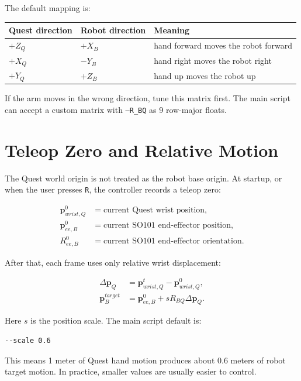 \documentclass[11pt]{article}
\begin{document}
The default mapping is:

\begin{center}
\begin{tabular}{lll}
\toprule
Quest direction & Robot direction & Meaning \\
\midrule
$+Z_Q$ & $+X_B$ & hand forward moves the robot forward \\
$+X_Q$ & $-Y_B$ & hand right moves the robot right \\
$+Y_Q$ & $+Z_B$ & hand up moves the robot up \\
\bottomrule
\end{tabular}
\end{center}

If the arm moves in the wrong direction, tune this matrix first. The main
script can accept a custom matrix with \texttt{--R\_BQ} as 9 row-major floats.

\section{Teleop Zero and Relative Motion}

The Quest world origin is not treated as the robot base origin. At startup, or
when the user presses \texttt{R}, the controller records a teleop zero:

\begin{align}
\mathbf{p}^{0}_{wrist,Q} &= \text{current Quest wrist position}, \\
\mathbf{p}^{0}_{ee,B} &= \text{current SO101 end-effector position}, \\
R^{0}_{ee,B} &= \text{current SO101 end-effector orientation}.
\end{align}

After that, each frame uses only relative wrist displacement:

\begin{align}
\Delta\mathbf{p}_{Q}
  &= \mathbf{p}^{t}_{wrist,Q} - \mathbf{p}^{0}_{wrist,Q}, \\
\mathbf{p}^{target}_{B}
  &= \mathbf{p}^{0}_{ee,B}
     + s R_{BQ}\Delta\mathbf{p}_{Q}.
\end{align}

Here $s$ is the position scale. The main script default is:

\begin{lstlisting}
--scale 0.6
\end{lstlisting}

This means 1 meter of Quest hand motion produces about 0.6 meters of robot
target motion. In practice, smaller values are usually easier to control.
\end{document}
